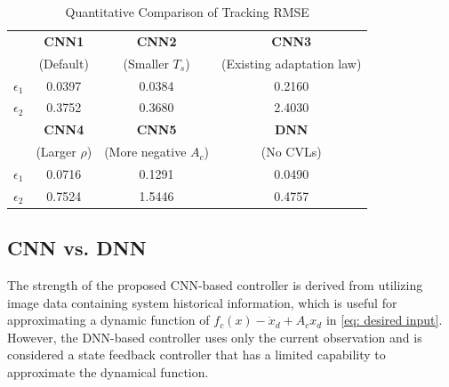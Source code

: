 \documentclass[letterpaper, 10 pt, conference]{ieeeconf}  %
\begin{document}
\begin{table}%
    \renewcommand{\arraystretch}{1.3}
    \caption{Quantitative Comparison of Tracking RMSE}
    \label{table: error norm}
    \centering
    \begin{tabular}{|c||c|c|c|}
    \hline
    & \bfseries CNN1 & \bfseries CNN2 & \bfseries CNN3 \\
    & (Default) & (Smaller $T_s$) & (Existing adaptation law) \\
    \hline 
    $\epsilon_1$ & 0.0397 & 0.0384 & 0.2160 \\
    \hline
    $\epsilon_2$ & 0.3752 & 0.3680 & 2.4030 \\
    \hline    
    & \bfseries CNN4 & \bfseries CNN5 & \bfseries DNN \\
    & (Larger $\rho$) & (More negative $A_c$) & (No CVLs) \\
    \hline 
    $\epsilon_1$ & 0.0716 & 0.1291 & 0.0490 \\
    \hline
    $\epsilon_2$ & 0.7524 & 1.5446 & 0.4757 \\
    \hline
    \end{tabular}
    \label{table: erro}
\end{table}

\subsection{CNN vs. DNN}

The strength of the proposed CNN-based controller is derived from utilizing image data containing system historical information, which is useful for approximating a dynamic function of $f_c(x)-\dot x_d+A_cx_d$ in \eqref{eq: desired input}. However, the DNN-based controller uses only the current observation and is considered a state feedback controller that has a limited capability to approximate the dynamical function. %
\end{document}
